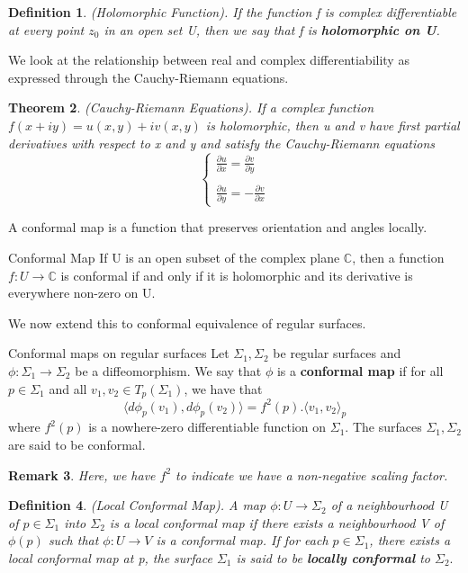 \documentclass[twoside]{article}
\newcounter{lecnum}
\newtheorem{theorem}{Theorem}[lecnum]
\newtheorem{definition}[theorem]{Definition}
\newtheorem{remark}[theorem]{Remark}
\begin{document}
\begin{definition}(Holomorphic Function). If the function f is complex differentiable at every point $z_0$ in an open set U, then we say that f is \textbf{holomorphic on U}.
\end{definition}

We look at the relationship between real and complex differentiability as expressed through the Cauchy-Riemann equations.

\begin{theorem}(Cauchy-Riemann Equations). If a complex function $f(x+iy) = u(x,y) + iv(x,y)$ is holomorphic, then u and v have first partial derivatives with respect to x and y and satisfy the Cauchy-Riemann equations 
$$
\begin{cases}
\frac{\partial u}{\partial x} = \frac{\partial v}{\partial y} \\
\\
\frac{\partial u}{\partial y} = -\frac{\partial v}{\partial x}
\end{cases}
$$
\end{theorem}

A conformal map is a function that preserves orientation and angles locally.
\begin{definition_exam}{Conformal Map}{} If U is an open subset of the complex plane $\mathbb{C}$, then a function $f: U \rightarrow \mathbb{C}$ is conformal if and only if it is holomorphic and its derivative is everywhere non-zero on U.
\end{definition_exam}

We now extend this to conformal equivalence of regular surfaces.

\begin{definition_exam}{Conformal maps on regular surfaces}{} Let $\Sigma_1, \Sigma_2$ be regular surfaces and $\phi: \Sigma_1 \rightarrow \Sigma_2$ be a diffeomorphism. We say that $\phi$ is a \textbf{conformal map} if for all $p \in \Sigma_1$ and all $v_1, v_2 \in T_p(\Sigma_1)$, we have that 
$$
\langle d\phi_p(v_1), d\phi_p(v_2) \rangle = f^2(p).\langle v_1, v_2 \rangle_p
$$
where $f^2(p)$ is a nowhere-zero differentiable function on $\Sigma_1.$ The surfaces $\Sigma_1, \Sigma_2$ are said to be conformal.
\end{definition_exam}

\begin{remark}Here, we have $f^2$ to indicate we have a non-negative scaling factor. 
\end{remark}

\begin{definition}(Local Conformal Map). A map $\phi: U \rightarrow \Sigma_2$ of a neighbourhood U of $p \in \Sigma_1$ into $\Sigma_2$ is a local conformal map if there exists a neighbourhood V of $\phi(p)$ such that $\phi: U \rightarrow V$ is a conformal map. If for each $p \in \Sigma_1$, there exists a local conformal map at p, the surface $\Sigma_1$ is said to be \textbf{locally conformal} to $\Sigma_2.$
\end{definition}
\end{document}
